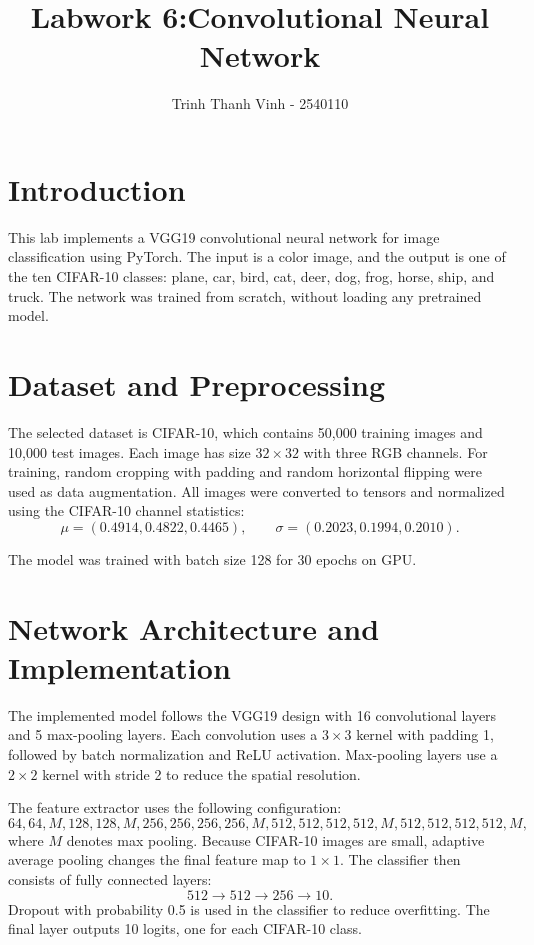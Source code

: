\documentclass[11pt]{article}
\title{Labwork 6:Convolutional Neural Network}
\author{Trinh Thanh Vinh - 2540110}
\date{}
\begin{document}
\maketitle

\section{Introduction}

This lab implements a VGG19 convolutional neural network for image classification using PyTorch. The input is a color image, and the output is one of the ten CIFAR-10 classes: plane, car, bird, cat, deer, dog, frog, horse, ship, and truck. The network was trained from scratch, without loading any pretrained model.

\section{Dataset and Preprocessing}

The selected dataset is CIFAR-10, which contains 50,000 training images and 10,000 test images. Each image has size $32 \times 32$ with three RGB channels. For training, random cropping with padding and random horizontal flipping were used as data augmentation. All images were converted to tensors and normalized using the CIFAR-10 channel statistics:
\[
\mu=(0.4914, 0.4822, 0.4465), \qquad
\sigma=(0.2023, 0.1994, 0.2010).
\]

The model was trained with batch size 128 for 30 epochs on GPU.

\section{Network Architecture and Implementation}

The implemented model follows the VGG19 design with 16 convolutional layers and 5 max-pooling layers. Each convolution uses a $3 \times 3$ kernel with padding 1, followed by batch normalization and ReLU activation. Max-pooling layers use a $2 \times 2$ kernel with stride 2 to reduce the spatial resolution.

The feature extractor uses the following configuration:
\[
64,64,M,128,128,M,256,256,256,256,M,512,512,512,512,M,512,512,512,512,M,
\]
where $M$ denotes max pooling. Because CIFAR-10 images are small, adaptive average pooling changes the final feature map to $1 \times 1$. The classifier then consists of fully connected layers:
\[
512 \rightarrow 512 \rightarrow 256 \rightarrow 10.
\]
Dropout with probability 0.5 is used in the classifier to reduce overfitting. The final layer outputs 10 logits, one for each CIFAR-10 class.
\end{document}
